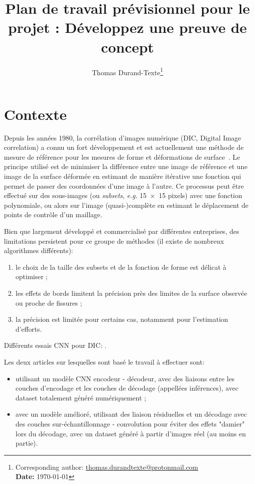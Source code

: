 \documentclass[
	a4paper, %
	10pt, %
	unnumberedsections, %
	twoside, %
]{LTJournalArticle}
\title{Plan de travail prévisionnel pour le projet : Développez une preuve de concept} %
\author{%
	Thomas Durand-Texte\thanks{Corresponding author: \href{mailto:thomas.durandtexte@protonmail.com}{thomas.durandtexte@protonmail.com}\\ \textbf{Date:} \today}
}
\begin{document}
\maketitle %


\section{Contexte}

Depuis les années 1980, la corrélation d'images numérique (DIC, Digital Image correlation) a connu un fort développement et est actuellement une méthode de mesure de référence pour les mesures de forme et déformations de surface~\cite{Schreir:2010}.
Le principe utilisé est de minimiser la différence entre une image de référence et une image de la surface déformée en estimant de manière itérative une fonction qui permet de passer des coordonnées d'une image à l'autre.
Ce processus peut être effectué sur des sous-images (ou \textit{subsets}, \textit{e.g.} 15~$\times$~15 pixels) avec une fonction polynomiale, ou alors sur l'image (quasi-)complète en estimant le déplacement de points de contrôle d'un maillage.

Bien que largement développé et commercialisé par différentes entreprises, des limitations persistent pour ce groupe de méthodes (il existe de nombreux algorithmes différents):
\begin{enumerate}
	\item le choix de la taille des subsets et de la fonction de forme est délicat à optimiser ;
	\item les effets de bords limitent la précision près des limites de la surface observée ou proche de fissures ;
	\item la précision est limitée pour certains cas, notamment pour l'estimation d'efforts.
\end{enumerate}


Différents essais CNN pour DIC: \cite{Min:2019,Boukhtache:2021,Yang:DeepDic2022,WANG:2023107278, DUAN:2023107234, BOUKHTACHE:2023107367, JIANG:2023103840}.

Les deux articles sur lesquelles sont basé le travail à effectuer sont:
\begin{itemize}
	\item \cite{Yang:DeepDic2022} utilisant un modèle CNN encodeur - décodeur, avec des liaisons entre les couches d'encodage et les couches de décodage (appellées inférences), avec dataset totalement généré numériquement ;
	\item \cite{WANG:2023107278} avec un modèle amélioré, utilisant des liaison résiduelles et un décodage avec des couches sur-échantillonnage - convolution pour éviter des effets "damier" lors du décodage, avec un dataset généré à partir d'images réel (au moins en partie). 
\end{itemize}
\end{document}
